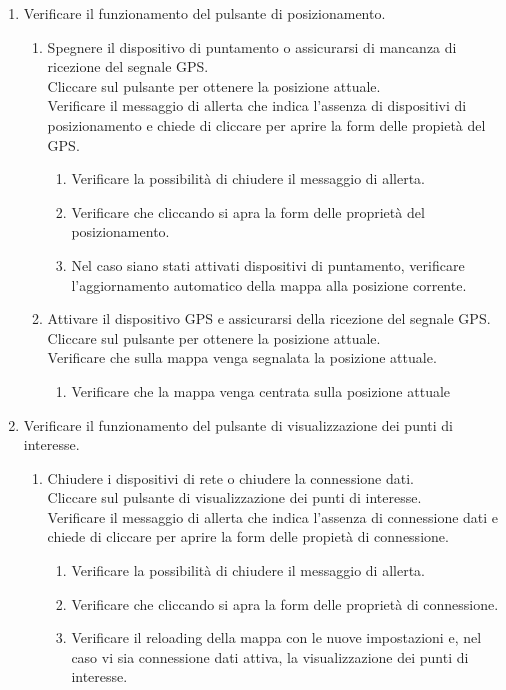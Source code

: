 \begin{enumerate}
\item Verificare il funzionamento del pulsante di posizionamento.
\begin{enumerate}
\item Spegnere il dispositivo di puntamento o assicurarsi di mancanza di ricezione del segnale GPS. \\Cliccare sul pulsante per ottenere la posizione attuale. \\Verificare il messaggio di allerta che indica l'assenza di dispositivi di posizionamento e chiede di cliccare per aprire la form delle propietà del GPS. 
\begin{enumerate}
\item Verificare la possibilità di chiudere il messaggio di allerta.
\item Verificare che cliccando si apra la form delle proprietà del posizionamento.
\item Nel caso siano stati attivati dispositivi di puntamento, verificare l'aggiornamento automatico della mappa alla posizione corrente.
\end{enumerate}
\item Attivare il dispositivo GPS e assicurarsi della ricezione del segnale GPS. \\Cliccare sul pulsante per ottenere la posizione attuale. \\Verificare che sulla mappa venga segnalata la posizione attuale.
\begin{enumerate}
\item Verificare che la mappa venga centrata sulla posizione attuale
\end{enumerate}
\end{enumerate}

\item Verificare il funzionamento del pulsante di visualizzazione dei punti di interesse.
\begin{enumerate}
\item Chiudere i dispositivi di rete o chiudere la connessione dati. \\Cliccare sul pulsante di visualizzazione dei punti di interesse.\\ Verificare il messaggio di allerta che indica l'assenza di connessione dati e chiede di cliccare per aprire la form delle propietà di connessione.
\begin{enumerate}
\item Verificare la possibilità di chiudere il messaggio di allerta.
\item Verificare che cliccando si apra la form delle proprietà di connessione.
\item Verificare il reloading della mappa con le nuove impostazioni e, nel caso vi sia connessione dati attiva, la visualizzazione dei punti di interesse.
\end{enumerate}


\end{enumerate}
\end{enumerate}
